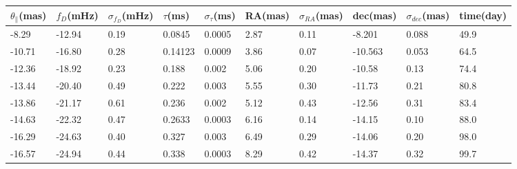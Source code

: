 \documentclass[useAMS,usenatbib]{mn2e}
\begin{document}
\begin{table}
\centering
\begin{tabular}{llllllllll}
\hline
$\theta_{\parallel}$(mas) &$f_D$(mHz) & $\sigma_{f_D}$(mHz) & $\tau$(ms) & $\sigma_{\tau}$(ms) & RA(mas) & $\sigma_{RA}$(mas) & dec(mas) & $\sigma_{dec}$(mas) & time(day)\\
\hline
 -8.29   & -12.94                            & 0.19      & 0.0845  & 0.0005          & 2.87    & 0.11                                     & -8.201     & 0.088      & 49.9                                \\

-10.71   &-16.80                             & 0.28      & 0.14123 & 0.0009         & 3.86    & 0.07                                     & -10.563    & 0.053      &64.5                                \\

-12.36   &-18.92                            & 0.23      & 0.188   & 0.002           & 5.06    & 0.20                                      & -10.58    & 0.13      &74.4                        \\

-13.44 & -20.40                             & 0.49      & 0.222   & 0.003           & 5.55    & 0.30                                      & -11.73    & 0.21      &80.8                                \\

-13.86 &-21.17                            & 0.61      & 0.236   & 0.002           & 5.12    & 0.43                                     & -12.56    & 0.31      &83.4                                \\

-14.63   &-22.32                            & 0.47      & 0.2633  & 0.0003          & 6.16    & 0.14                                     & -14.15    & 0.10       &88.0                                \\

-16.29   &-24.63                            & 0.40       & 0.327  & 0.003          & 6.49    & 0.29                                     & -14.06    & 0.20       &98.0                                \\

-16.57  &-24.94                            & 0.44      & 0.338 & 0.0003         & 8.29    & 0.42                                     & -14.37    & 0.32      &99.7                                \\


\end{tabular}
\end{table}
\end{document}
